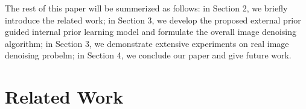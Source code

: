 \documentclass[10pt,twocolumn,letterpaper]{article}
\begin{document}
The rest of this paper will be summerized as follows: in Section 2, we briefly introduce the related work; in Section 3, we develop the proposed external prior guided internal prior learning model and formulate the overall image denoising algorithm; in Section 3, we demonstrate extensive experiments on real image denoising probelm; in Section 4, we conclude our paper and give future work.

\section{Related Work}

\begin{figure}
\centering
{}
\end{figure}
\end{document}
